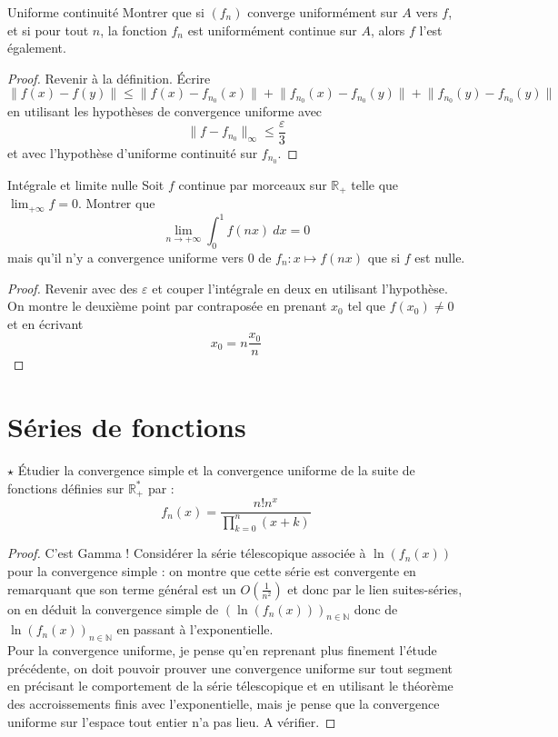\documentclass[french,a4paper]{article}
\newcommand{\N}{\mathbb{N}}
\newcommand{\R}{\mathbb{R}}
\newcommand{\st}{^*}
\theoremstyle{plain}
\theoremstyle{definition}
\theoremstyle{remark}
\begin{document}
\begin{ex}{Uniforme continuité}
	Montrer que si $(f_n)$ converge uniformément sur $A$ vers $f$, et si pour tout $n$, la fonction $f_n$ est uniformément continue sur $A$, alors $f$ l'est également.
\end{ex}
\begin{proof}
	Revenir à la définition. Écrire $$\lVert f(x)-f(y)\rVert\leqslant\lVert f(x)-f_{n_0}(x)\rVert+\lVert f_{n_0}(x)-f_{n_0}(y)\rVert+\lVert f_{n_0}(y)-f_{n_0}(y)\rVert$$ en utilisant les hypothèses de convergence uniforme avec $$\lVert f-f_{n_0}\rVert_\infty\leqslant\frac{\varepsilon}{3}$$ et avec l'hypothèse d'uniforme continuité sur $f_{n_0}$. 
\end{proof}

\begin{ex}{Intégrale et limite nulle}
	Soit $f$ continue par morceaux sur $\R_+$ telle que $\lim_{+\infty}f=0$. Montrer que $$\lim_{n\to+\infty}\int_{0}^{1}f(nx)\ dx=0$$ mais qu'il n'y a convergence uniforme vers $0$ de $f_n:x\mapsto f(nx)$ que si $f$ est nulle.
\end{ex}
\begin{proof}
	Revenir avec des $\varepsilon$ et couper l'intégrale en deux en utilisant l'hypothèse. On montre le deuxième point par contraposée en prenant $x_0$ tel que $f(x_0)\ne 0$ et en écrivant $$x_0=n\frac{x_0}{n}$$
\end{proof}

\section{Séries de fonctions}

\begin{ex}{$\star$}
	Étudier la convergence simple et la convergence uniforme de la suite de fonctions définies sur $\R_+\st$ par : $$f_n(x)=\frac{n!n^x}{\prod_{k=0}^{n}(x+k)}$$
\end{ex}
\begin{proof}
	C'est Gamma ! Considérer la série télescopique associée à $\ln(f_n(x))$ pour la convergence simple : on montre que cette série est convergente en remarquant que son terme général est un $\displaystyle O\left(\frac{1}{n^2}\right)$ et donc par le lien suites-séries, on en déduit la convergence simple de $(\ln(f_n(x)))_{n\in\N}$ donc de $\ln(f_n(x))_{n\in\N}$ en passant à l'exponentielle. \\ Pour la convergence uniforme, je pense qu'en reprenant plus finement l'étude précédente, on doit pouvoir prouver une convergence uniforme sur tout segment en précisant le comportement de la série télescopique et en utilisant le théorème des accroissements finis avec l'exponentielle, mais je pense que la convergence uniforme sur l'espace tout entier n'a pas lieu. A vérifier.
\end{proof}
\end{document}
